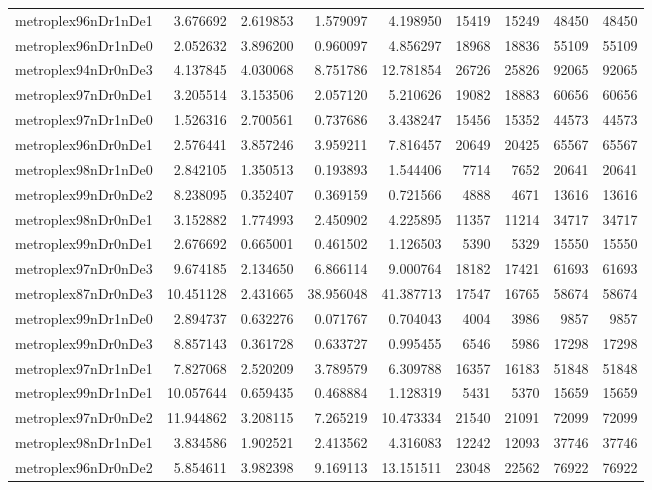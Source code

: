 \begin{longtable}{|l|r|r|r|r|r|r|r|r|}
metroplex96nDr1nDe1 & 3.676692 & 2.619853 & 1.579097 & 4.198950 & 15419 & 15249 & 48450 & 48450 \\
metroplex96nDr1nDe0 & 2.052632 & 3.896200 & 0.960097 & 4.856297 & 18968 & 18836 & 55109 & 55109 \\
metroplex94nDr0nDe3 & 4.137845 & 4.030068 & 8.751786 & 12.781854 & 26726 & 25826 & 92065 & 92065 \\
metroplex97nDr0nDe1 & 3.205514 & 3.153506 & 2.057120 & 5.210626 & 19082 & 18883 & 60656 & 60656 \\
metroplex97nDr1nDe0 & 1.526316 & 2.700561 & 0.737686 & 3.438247 & 15456 & 15352 & 44573 & 44573 \\
metroplex96nDr0nDe1 & 2.576441 & 3.857246 & 3.959211 & 7.816457 & 20649 & 20425 & 65567 & 65567 \\
metroplex98nDr1nDe0 & 2.842105 & 1.350513 & 0.193893 & 1.544406 & 7714 & 7652 & 20641 & 20641 \\
metroplex99nDr0nDe2 & 8.238095 & 0.352407 & 0.369159 & 0.721566 & 4888 & 4671 & 13616 & 13616 \\
metroplex98nDr0nDe1 & 3.152882 & 1.774993 & 2.450902 & 4.225895 & 11357 & 11214 & 34717 & 34717 \\
metroplex99nDr0nDe1 & 2.676692 & 0.665001 & 0.461502 & 1.126503 & 5390 & 5329 & 15550 & 15550 \\
metroplex97nDr0nDe3 & 9.674185 & 2.134650 & 6.866114 & 9.000764 & 18182 & 17421 & 61693 & 61693 \\
metroplex87nDr0nDe3 & 10.451128 & 2.431665 & 38.956048 & 41.387713 & 17547 & 16765 & 58674 & 58674 \\
metroplex99nDr1nDe0 & 2.894737 & 0.632276 & 0.071767 & 0.704043 & 4004 & 3986 & 9857 & 9857 \\
metroplex99nDr0nDe3 & 8.857143 & 0.361728 & 0.633727 & 0.995455 & 6546 & 5986 & 17298 & 17298 \\
metroplex97nDr1nDe1 & 7.827068 & 2.520209 & 3.789579 & 6.309788 & 16357 & 16183 & 51848 & 51848 \\
metroplex99nDr1nDe1 & 10.057644 & 0.659435 & 0.468884 & 1.128319 & 5431 & 5370 & 15659 & 15659 \\
metroplex97nDr0nDe2 & 11.944862 & 3.208115 & 7.265219 & 10.473334 & 21540 & 21091 & 72099 & 72099 \\
metroplex98nDr1nDe1 & 3.834586 & 1.902521 & 2.413562 & 4.316083 & 12242 & 12093 & 37746 & 37746 \\
metroplex96nDr0nDe2 & 5.854611 & 3.982398 & 9.169113 & 13.151511 & 23048 & 22562 & 76922 & 76922 \\

\end{longtable}
